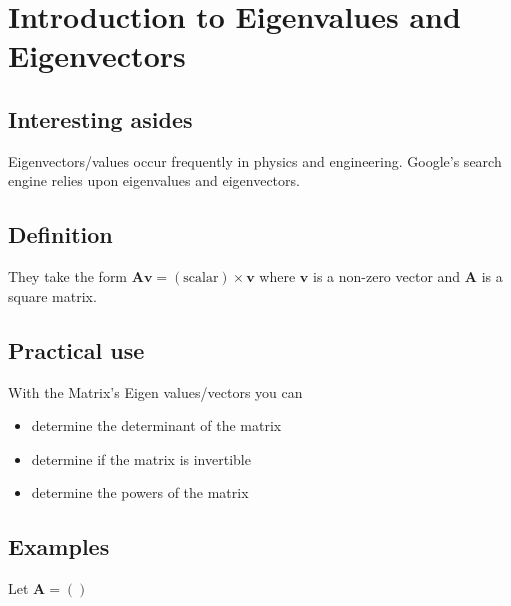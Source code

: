 \documentclass[openany]{scrbook}
\newcommand{\matr}[1]{\mathbf{#1}} %
\newcommand{\vect}[1]{\mathbf{#1}}
\begin{document}
\section{Introduction to Eigenvalues and Eigenvectors}

\subsection{Interesting asides}
Eigen{vectors/values} occur frequently in physics and engineering. Google's search engine relies upon eigenvalues and eigenvectors.

\subsection{Definition}
They take the form $\matr{A}\vect{v}=(\text{scalar}) \times \vect{v}$ where $\vect{v}$ is a non-zero vector and $\matr{A}$ is a square matrix.

\subsection{Practical use}
With the Matrix's Eigen values/vectors you can
\begin{itemize}
    \item determine the determinant of the matrix
    \item determine if the matrix is invertible
    \item determine the powers of the matrix 
\end{itemize}

\subsection{Examples}
Let $\matr{A}=()  $
\end{document}
